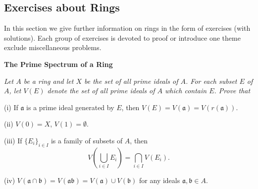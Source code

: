 \subsection{Exercises about Rings}
In this section we give further information on rings in the form of exercises (with solutions). Each group of exercises is devoted to proof or introduce one theme exclude miscellaneous problems.
\begin{center}
\begin{large}
    \textbf{The Prime Spectrum of a Ring}
\end{large}
\end{center}
\begin{problem}\em
Let $A$ be a ring and let $X$ be the set of all prime ideals of $A$. For each subset $E$ of $A$, let $V(E)$ denote the set of all prime ideals of $A$ which contain $E$. Prove that \par
(i) If $\mathfrak{a}$ is a prime ideal generated by $E$, then $V(E)=V(\mathfrak{a})=V(r(\mathfrak{a}))$.\par
(ii) $V(0)=X$, $V(1)=\emptyset$.\par
(iii) If $\{E_i\}_{i\in I}$ is a family of subsets of $A$, then 
$$
V\left( \bigcup_{i\in I}{E_i} \right) =\bigcap_{i\in I}{V\left( E_i \right)}.
$$\par
(iv) $V(\mathfrak{a}\cap\mathfrak{b})=V(\mathfrak{a}\mathfrak{b})=V(\mathfrak{a})\cup V(\mathfrak{b})$ for any ideals $\mathfrak{a},\mathfrak{b}\in A$.
\end{problem}
